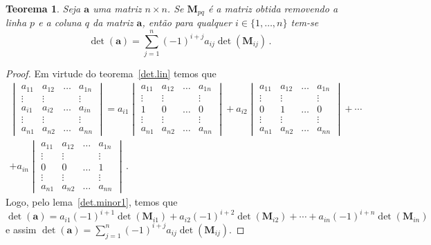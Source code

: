 \documentclass[12pt,a4paper]{report}
\newcommand{\mb}{\mathbf}
\newtheorem{thm}{Teorema}[chapter]
\begin{document}
\begin{thm}
  Seja $\mb a$ uma matriz $n\times n$. Se $\mb M_{pq}$ é a matriz obtida removendo a linha $p$ e a coluna $q$ da matriz $\mb a$, então para qualquer $i\in\{1,\ldots,n\}$ tem-se
  $$\det(\mb a)=\sum_{j=1}^n(-1)^{i+j}a_{ij}\det(\mb M_{ij})\,.$$
\end{thm}
\begin{proof}
  Em virtude do teorema~\ref{det.lin} temos que
  \begin{multline*}
    \begin{vmatrix}
      a_{11}&a_{12}&\ldots&a_{1n}\\
      \vdots&\vdots&&\vdots\\
      a_{i1}&a_{i2}&\ldots&a_{in}\\
      \vdots&\vdots&&\vdots\\
      a_{n1}&a_{n2}&\ldots&a_{nn}
    \end{vmatrix}=a_{i1}\begin{vmatrix}
      a_{11}&a_{12}&\ldots&a_{1n}\\
      \vdots&\vdots&&\vdots\\
      1&0&\ldots&0\\
      \vdots&\vdots&&\vdots\\
      a_{n1}&a_{n2}&\ldots&a_{nn}
    \end{vmatrix}+a_{i2}\begin{vmatrix}
      a_{11}&a_{12}&\ldots&a_{1n}\\
      \vdots&\vdots&&\vdots\\
      0&1&\ldots&0\\
      \vdots&\vdots&&\vdots\\
      a_{n1}&a_{n2}&\ldots&a_{nn}
    \end{vmatrix}+\cdots\\
    +a_{in}\begin{vmatrix}
      a_{11}&a_{12}&\ldots&a_{1n}\\
      \vdots&\vdots&&\vdots\\
      0&0&\ldots&1\\
      \vdots&\vdots&&\vdots\\
      a_{n1}&a_{n2}&\ldots&a_{nn}
    \end{vmatrix}\,.
  \end{multline*}
  Logo, pelo lema~\ref{det.minor1}, temos que
  $$\det(\mb a)=a_{i1}(-1)^{i+1}\det(\mb M_{i1})+a_{i2}(-1)^{i+2}\det(\mb M_{i2})+\cdots+a_{in}(-1)^{i+n}\det(\mb M_{in})$$
  e assim $\det(\mb a)=\sum_{j=1}^n(-1)^{i+j}a_{ij}\det(\mb M_{ij})$.
\end{proof}
\end{document}
